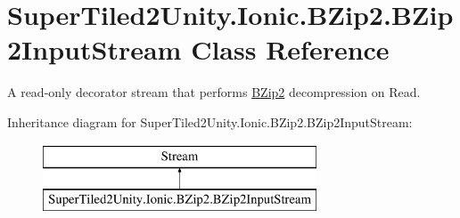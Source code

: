 \hypertarget{class_super_tiled2_unity_1_1_ionic_1_1_b_zip2_1_1_b_zip2_input_stream}{}\section{Super\+Tiled2\+Unity.\+Ionic.\+B\+Zip2.\+B\+Zip2\+Input\+Stream Class Reference}
\label{class_super_tiled2_unity_1_1_ionic_1_1_b_zip2_1_1_b_zip2_input_stream}


A read-\/only decorator stream that performs \mbox{\hyperlink{namespace_super_tiled2_unity_1_1_ionic_1_1_b_zip2}{B\+Zip2}} decompression on Read.  


Inheritance diagram for Super\+Tiled2\+Unity.\+Ionic.\+B\+Zip2.\+B\+Zip2\+Input\+Stream\+:\begin{figure}[H]
\begin{center}
\leavevmode
\includegraphics[height=2.000000cm]{class_super_tiled2_unity_1_1_ionic_1_1_b_zip2_1_1_b_zip2_input_stream}
\end{center}
\end{figure}
